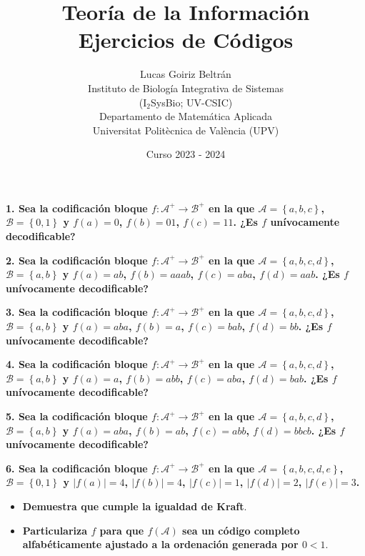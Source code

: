 \documentclass{article}
\title{Teoría de la Información\\Ejercicios de Códigos}
\date{Curso 2023 - 2024}
\author{Lucas Goiriz Beltrán\\ Instituto de Biología Integrativa de Sistemas\\(I$_2$SysBio; UV-CSIC)\\Departamento de Matemática Aplicada\\Universitat Politècnica de València (UPV)}
\begin{document}
\maketitle

\textbf{
1. Sea la codificación bloque $f:\mathcal{A}^+\rightarrow\mathcal{B}^+$ en la que $\mathcal{A}=\left\{a,b,c\right\}$, $\mathcal{B}=\left\{0,1\right\}$ y $f(a)=0$, $f(b) = 01$, $f(c)=11$. ¿Es $f$ unívocamente decodificable?
}

\vspace{1cm}

\textbf{
2. Sea la codificación bloque $f:\mathcal{A}^+\rightarrow\mathcal{B}^+$ en la que $\mathcal{A}=\left\{a,b,c,d\right\}$, $\mathcal{B}=\left\{a,b\right\}$ y $f(a)=ab$, $f(b) = aaab$, $f(c)=aba$, $f(d)=aab$. ¿Es $f$ unívocamente decodificable?
}

\vspace{1cm}

\textbf{
3. Sea la codificación bloque $f:\mathcal{A}^+\rightarrow\mathcal{B}^+$ en la que $\mathcal{A}=\left\{a,b,c,d\right\}$, $\mathcal{B}=\left\{a,b\right\}$ y $f(a)=aba$, $f(b) = a$, $f(c)=bab$, $f(d)=bb$. ¿Es $f$ unívocamente decodificable?
}

\vspace{1cm}

\textbf{
4. Sea la codificación bloque $f:\mathcal{A}^+\rightarrow\mathcal{B}^+$ en la que $\mathcal{A}=\left\{a,b,c,d\right\}$, $\mathcal{B}=\left\{a,b\right\}$ y $f(a)=a$, $f(b) = abb$, $f(c)=aba$, $f(d)=bab$. ¿Es $f$ unívocamente decodificable?
}

\vspace{1cm}

\textbf{
5. Sea la codificación bloque $f:\mathcal{A}^+\rightarrow\mathcal{B}^+$ en la que $\mathcal{A}=\left\{a,b,c,d\right\}$, $\mathcal{B}=\left\{a,b\right\}$ y $f(a)=aba$, $f(b) = ab$, $f(c)=abb$, $f(d)=bbcb$. ¿Es $f$ unívocamente decodificable?
}

\pagebreak

\textbf{
6. Sea la codificación bloque $f:\mathcal{A}^+\rightarrow\mathcal{B}^+$ en la que $\mathcal{A}=\left\{a,b,c,d,e\right\}$, $\mathcal{B}=\left\{0,1\right\}$ y $\left|f(a)\right|=4$, $\left|f(b)\right|=4$, $\left|f(c)\right|=1$, $\left|f(d)\right|=2$, $\left|f(e)\right|=3$.
}

\begin{itemize}
    \item\textbf{Demuestra que cumple la igualdad de Kraft}.
    \item\textbf{Particulariza $f$ para que $f\left(\mathcal{A}\right)$ sea un código completo alfabéticamente ajustado a la ordenación generada por $0<1$}.
\end{itemize}
\end{document}
